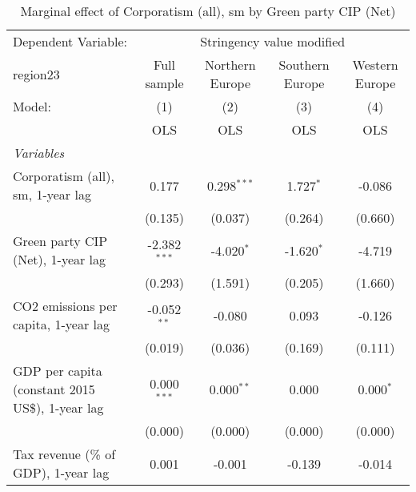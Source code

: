 
\begin{table}[htbp]
   \caption{Marginal effect of Corporatism (all), sm by Green party CIP (Net)}
   \centering
   \begin{tabular}{lcccc}
      \toprule
      Dependent Variable: & \multicolumn{4}{c}{Stringency value modified}\\
      region23                                                              & Full sample    & Northern Europe & Southern Europe & Western Europe \\   
      Model:                                                                & (1)            & (2)             & (3)             & (4)\\  
                                                                            &  OLS           & OLS             & OLS             & OLS\\  
      \midrule
      \emph{Variables}\\
      Corporatism (all), sm, 1-year lag                                     & 0.177          & 0.298$^{***}$   & 1.727$^{*}$     & -0.086\\   
                                                                            & (0.135)        & (0.037)         & (0.264)         & (0.660)\\   
      Green party CIP (Net), 1-year lag                                     & -2.382$^{***}$ & -4.020$^{*}$    & -1.620$^{*}$    & -4.719\\   
                                                                            & (0.293)        & (1.591)         & (0.205)         & (1.660)\\   
      CO2 emissions per capita, 1-year lag                                  & -0.052$^{**}$  & -0.080          & 0.093           & -0.126\\   
                                                                            & (0.019)        & (0.036)         & (0.169)         & (0.111)\\   
      GDP per capita (constant 2015 US\$), 1-year lag                       & 0.000$^{***}$  & 0.000$^{**}$    & 0.000           & 0.000$^{*}$\\   
                                                                            & (0.000)        & (0.000)         & (0.000)         & (0.000)\\   
      Tax revenue (\% of GDP), 1-year lag                                   & 0.001          & -0.001          & -0.139          & -0.014\\   

\end{tabular}
\end{table}
